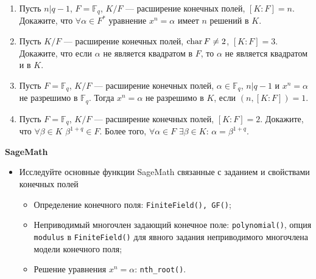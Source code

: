 \begin{enumerate}[topsep=0pt]
    \item Пусть $n|q-1$, $F=\mathbb{F}_q$, $K/F$ --- расширение конечных полей, $[K:F] = n$. Докажите, что $\forall \alpha \in F^*$ уравнение $x^n=\alpha$ имеет $n$ решений в $K$. %

    \item Пусть $K/F$ --- расширение конечных полей, $\operatorname{char} F \neq 2$, $[K:F] = 3$. Докажите, что если $\alpha$ не является квадратом в $F$, то $\alpha$ не является квадратом и в $K$. %

    \item Пусть $F=\mathbb{F}_q$, $K/F$ --- расширение конечных полей, $\alpha \in \mathbb{F}_q$, $n|q-1$ и $x^n=\alpha$ не разрешимо в $\mathbb{F}_q$. Тогда $x^n=\alpha$ не разрешимо в $K$, если $(n,[K:F])=1$. %

    \item Пусть $F=\mathbb{F}_q$, $K/F$ --- расширение конечных полей, $[K:F] = 2$. Докажите, что $\forall \beta \in K$ $\beta^{1+q} \in F$. Более того, $\forall \alpha \in F$ $\exists \beta \in K$: $\alpha=\beta^{1+q}$. %

\end{enumerate}

\noindent\textbf{SageMath}
\begin{itemize}[topsep=0pt]
    \item Исследуйте основные функции SageMath связанные с заданием и свойствами конечных полей
    \begin{itemize}[noitemsep,topsep=0pt]
        \item Определение конечного поля: \texttt{FiniteField(), GF()};
        \item Неприводимый многочлен задающий конечное поле: \texttt{polynomial()}, опция \texttt{modulus} в \texttt{FiniteField()} для явного задания неприводимого многочлена модели конечного поля;
        \item Решение уравнения $x^n=\alpha$: \texttt{nth\_root()}.
     \end{itemize}
\end{itemize}

